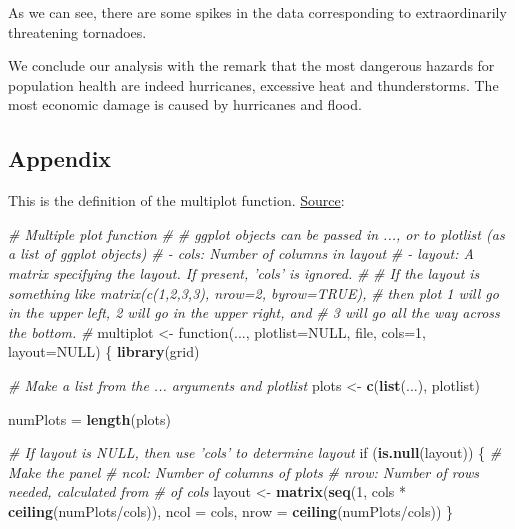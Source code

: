 \documentclass[]{article}
\newenvironment{Shaded}{\begin{snugshade}}{\end{snugshade}}
\newcommand{\KeywordTok}[1]{\textcolor[rgb]{0.13,0.29,0.53}{\textbf{{#1}}}}
\newcommand{\DataTypeTok}[1]{\textcolor[rgb]{0.13,0.29,0.53}{{#1}}}
\newcommand{\DecValTok}[1]{\textcolor[rgb]{0.00,0.00,0.81}{{#1}}}
\newcommand{\StringTok}[1]{\textcolor[rgb]{0.31,0.60,0.02}{{#1}}}
\newcommand{\CommentTok}[1]{\textcolor[rgb]{0.56,0.35,0.01}{\textit{{#1}}}}
\newcommand{\OtherTok}[1]{\textcolor[rgb]{0.56,0.35,0.01}{{#1}}}
\newcommand{\NormalTok}[1]{{#1}}
\begin{document}
As we can see, there are some spikes in the data corresponding to
extraordinarily threatening tornadoes.

We conclude our analysis with the remark that the most dangerous hazards
for population health are indeed hurricanes, excessive heat and
thunderstorms. The most economic damage is caused by hurricanes and
flood.

\subsection{Appendix}\label{appendix}

This is the definition of the multiplot function.
\href{http://www.cookbook-r.com/Graphs/Multiple_graphs_on_one_page_(ggplot2)}{Source}:

\begin{Shaded}
\begin{Highlighting}[]
\CommentTok{# Multiple plot function}
\CommentTok{#}
\CommentTok{# ggplot objects can be passed in ..., or to plotlist (as a list of ggplot objects)}
\CommentTok{# - cols:   Number of columns in layout}
\CommentTok{# - layout: A matrix specifying the layout. If present, 'cols' is ignored.}
\CommentTok{#}
\CommentTok{# If the layout is something like matrix(c(1,2,3,3), nrow=2, byrow=TRUE),}
\CommentTok{# then plot 1 will go in the upper left, 2 will go in the upper right, and}
\CommentTok{# 3 will go all the way across the bottom.}
\CommentTok{#}
\NormalTok{multiplot <-}\StringTok{ }\NormalTok{function(..., }\DataTypeTok{plotlist=}\OtherTok{NULL}\NormalTok{, file, }\DataTypeTok{cols=}\DecValTok{1}\NormalTok{, }\DataTypeTok{layout=}\OtherTok{NULL}\NormalTok{) \{}
  \KeywordTok{library}\NormalTok{(grid)}

  \CommentTok{# Make a list from the ... arguments and plotlist}
  \NormalTok{plots <-}\StringTok{ }\KeywordTok{c}\NormalTok{(}\KeywordTok{list}\NormalTok{(...), plotlist)}

  \NormalTok{numPlots =}\StringTok{ }\KeywordTok{length}\NormalTok{(plots)}

  \CommentTok{# If layout is NULL, then use 'cols' to determine layout}
  \NormalTok{if (}\KeywordTok{is.null}\NormalTok{(layout)) \{}
    \CommentTok{# Make the panel}
    \CommentTok{# ncol: Number of columns of plots}
    \CommentTok{# nrow: Number of rows needed, calculated from # of cols}
    \NormalTok{layout <-}\StringTok{ }\KeywordTok{matrix}\NormalTok{(}\KeywordTok{seq}\NormalTok{(}\DecValTok{1}\NormalTok{, cols *}\StringTok{ }\KeywordTok{ceiling}\NormalTok{(numPlots/cols)),}
                    \DataTypeTok{ncol =} \NormalTok{cols, }\DataTypeTok{nrow =} \KeywordTok{ceiling}\NormalTok{(numPlots/cols))}
  \NormalTok{\}}


\end{Highlighting}
\end{Shaded}
\end{document}
